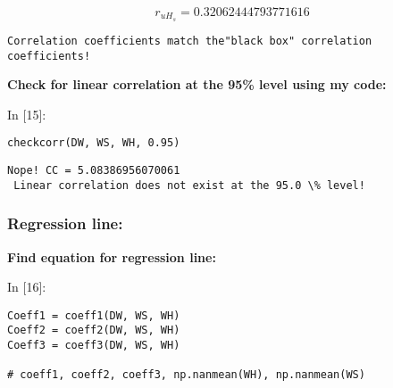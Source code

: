 \documentclass[11pt]{article}
\newif\ifcode
\newif\ifleftmargins
\newlength{\promptlength}
\newcommand{\prompt}[3]{
        \needspace{1.1cm}
        \settowidth{\promptlength}{ #1 [#3] }
        \ifleftmargins\hspace{-\promptlength}\hspace{-5pt}\fi
        {\color{#2}#1 [#3]:}
        \ifleftmargins\vspace{-2.7ex}\fi
    }
\renewcommand{\paragraph}{\textbf}
\begin{document}
    $$r_{uH_s}=0.32062444793771616$$

    
    \begin{Verbatim}[commandchars=\\\{\}]
Correlation coefficients match the"black box" correlation coefficients!

    \end{Verbatim}

    \hypertarget{check-for-linear-correlation-at-the-95-level-using-my-code}{%
\paragraph{Check for linear correlation at the 95\% level using my
code:}\label{check-for-linear-correlation-at-the-95-level-using-my-code}}

    
\prompt{In}{incolor}{15}
\codetrue
\begin{tcolorbox}[breakable, size=fbox, boxrule=1pt, pad at break*=1mm, colback=cellbackground, colframe=cellborder]
\begin{verbatim}
checkcorr(DW, WS, WH, 0.95)
\end{verbatim}
\end{tcolorbox}
\codefalse

    \begin{Verbatim}[commandchars=\\\{\}]
Nope! CC = 5.08386956070061
 Linear correlation does not exist at the 95.0 \% level!

    \end{Verbatim}

    \hypertarget{regression-line}{%
\subsubsection{Regression line:}\label{regression-line}}

\hypertarget{find-equation-for-regression-line}{%
\paragraph{Find equation for regression
line:}\label{find-equation-for-regression-line}}

    
\prompt{In}{incolor}{16}
\codetrue
\begin{tcolorbox}[breakable, size=fbox, boxrule=1pt, pad at break*=1mm, colback=cellbackground, colframe=cellborder]
\begin{verbatim}
Coeff1 = coeff1(DW, WS, WH)
Coeff2 = coeff2(DW, WS, WH)
Coeff3 = coeff3(DW, WS, WH)

# coeff1, coeff2, coeff3, np.nanmean(WH), np.nanmean(WS)
\end{verbatim}
\end{tcolorbox}
\codefalse
\end{document}
